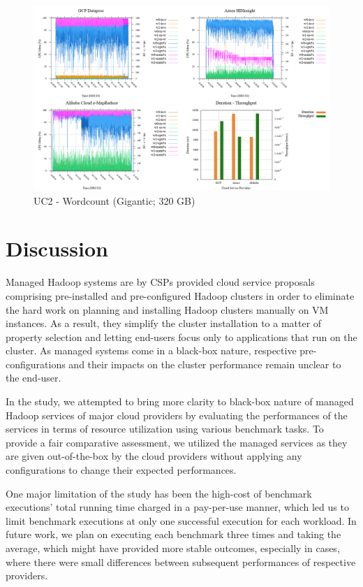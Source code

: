 \documentclass[review]{elsarticle}
\begin{document}
\begin{figure}[p]
	\caption{UC2 - Wordcount (Gigantic; 320 GB)}
	\label{fig:uc2-wrdcnt-g-cmidt}
	\includegraphics[width=\textwidth]{uc2-wrdcnt-g-cmidt}
	\centering
\end{figure}

\section{Discussion}
Managed Hadoop systems are by CSPs provided cloud service proposals comprising pre-installed and pre-configured Hadoop clusters in order to eliminate the hard work on planning and installing Hadoop clusters manually on VM instances. As a result, they simplify the cluster installation to a matter of property selection and letting end-users focus only to applications that run on the cluster. As managed systems come in a black-box nature, respective pre-configurations and their impacts on the cluster performance remain unclear to the end-user. 

In the study, we attempted to bring more clarity to black-box nature of managed Hadoop services of major cloud providers by evaluating the performances of the services in terms of resource utilization using various benchmark tasks. To provide a fair comparative assessment, we utilized the managed services as they are given out-of-the-box by the cloud providers without applying any configurations to change their expected performances. 

One major limitation of the study has been the high-cost of benchmark executions' total running time charged in a pay-per-use manner, which led us to limit benchmark executions at only one successful execution for each workload. In future work, we plan on executing each benchmark three times and taking the average, which might have provided more stable outcomes, especially in cases, where there were small differences between subsequent performances of respective providers. 
\end{document}
